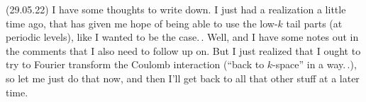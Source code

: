 \documentclass{report}
\begin{document}

(29.05.22) I have some thoughts to write down. I just had a realization a little time ago, that has given me hope of being able to use the low-$k$ tail parts (at periodic levels), like I wanted to be the case.\,. Well, and I have some notes out in the comments that I also need to follow up on. But I just realized that I ought to try to Fourier transform the Coulomb interaction (``back to $k$-space'' in a way.\,.), so let me just do that now, and then I'll get back to all that other stuff at a later time.
\end{document}
